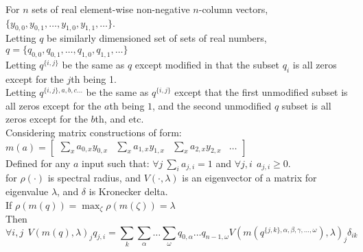 \pagebreak

\begin{Theorem}\label{th:5}
For $n$ sets of real element-wise non-negative $n$-column vectors, $\{y_{0,0},y_{0,1},\dots,y_{1,0},y_{1,1},\dots\}$.\\
Letting $q$ be similarly dimensioned set of sets of real numbers, $q=\{q_{0,0},q_{0,1},\dots,q_{1,0},q_{1,1},\dots\}$\\
Letting $q^{\{i,j\}}$ be the same as $q$ except modified in that the subset $q_i$ is all zeros except for the $j$th being 1.\\ 
Letting $q^{\{i,j\},a,b,c\dots}$ be the same as $q^{\{i,j\}}$ except that the first unmodified subset is all zeros except for the $a$th being $1$, and the second unmodified $q$ subset is all zeros except for the $b$th, and etc.\\
Considering matrix constructions of form: \\
$m(a) = 
\left[\begin{array}{c|c|c|c}
\sum_{x}a_{0,x}y_{0,x} & 
\sum_{x}a_{1,x}y_{1,x} & 
\sum_{x}a_{2,x}y_{2,x} & \dots
\end{array}\right]$\\
Defined for any $a$ input such that: $\forall j~\sum_{i}a_{j,i}=1$ and $\forall j,i~~a_{j,i}\ge 0$.\\
for $\rho(\cdot)$ is spectral radius, and $V(\cdot,\lambda)$ is an eigenvector of a matrix for eigenvalue $\lambda$, and $\delta$ is Kronecker delta.\\
If $\rho(m(q)) = \max_\zeta\rho(m(\zeta))=\lambda$\\
Then
$$ \forall i,j~~V(m(q),\lambda)_jq_{j,i} = \sum_k\sum_\alpha\dots\sum_\omega q_{0,\alpha}\dots q_{n-1,\omega}V(m(q^{\{j,k\},\alpha,\beta,\gamma,\dots,\omega}),\lambda)_j\delta_{ik} $$
\end{Theorem}

